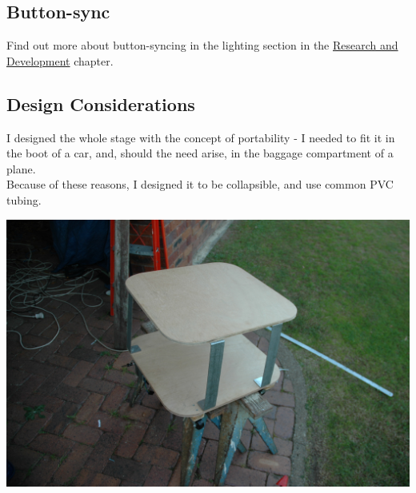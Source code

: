     		\subsection{Button-sync}
    			Find out more about button-syncing in the lighting section in the \hyperref[RandD]{Research and Development} chapter.
    	
    	\subsection{Design Considerations}
    		I designed the whole stage with the concept of portability - I needed to fit it in the boot of a car, and, should the need arise, in the baggage compartment of a plane.\\
    		
    		Because of these reasons, I designed it to be collapsible, and use common PVC tubing.\\
    		
    		\centerline{\includegraphics[width=0.75\linewidth]{images/SecondDeck}}